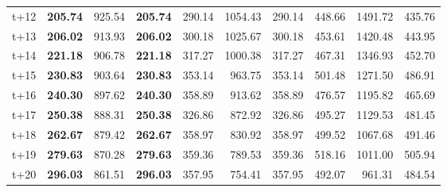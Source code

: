 \begin{table}[H]
\begin{tabular}{lrrrrrrrrr}
t+12  & \textbf{205.74}  & 925.54  & \textbf{205.74}  & 290.14  & 1054.43  & 290.14  & 448.66  & 1491.72  & 435.76  \\
t+13  & \textbf{206.02}  & 913.93  & \textbf{206.02}  & 300.18  & 1025.67  & 300.18  & 453.61  & 1420.48  & 443.95  \\
t+14  & \textbf{221.18}  & 906.78  & \textbf{221.18}  & 317.27  & 1000.38  & 317.27  & 467.31  & 1346.93  & 452.70  \\
t+15  & \textbf{230.83}  & 903.64  & \textbf{230.83}  & 353.14  & 963.75  & 353.14  & 501.48  & 1271.50  & 486.91  \\
t+16  & \textbf{240.30}  & 897.62  & \textbf{240.30}  & 358.89  & 913.62  & 358.89  & 476.57  & 1195.82  & 465.69  \\
t+17  & \textbf{250.38}  & 888.31  & \textbf{250.38}  & 326.86  & 872.92  & 326.86  & 495.27  & 1129.53  & 481.45  \\
t+18  & \textbf{262.67}  & 879.42  & \textbf{262.67}  & 358.97  & 830.92  & 358.97  & 499.52  & 1067.68  & 491.46  \\
t+19  & \textbf{279.63}  & 870.28  & \textbf{279.63}  & 359.36  & 789.53  & 359.36  & 518.16  & 1011.00  & 505.94  \\
t+20  & \textbf{296.03}  & 861.51  & \textbf{296.03}  & 357.95  & 754.41  & 357.95  & 492.07  & 961.31  & 484.54  \\

\bottomrule
\end{tabular}
\end{table}
